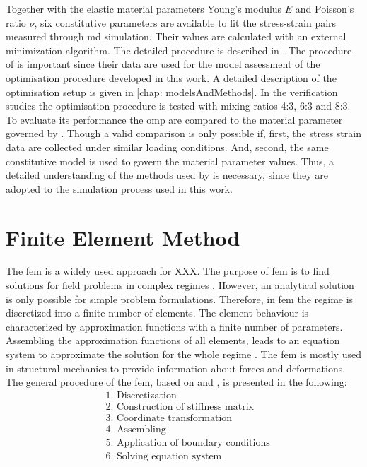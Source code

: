 Together with the elastic material parameters Young's modulus $E$ and Poisson's ratio $\nu$, six constitutive parameters are available to fit the stress-strain pairs measured through \acrshort{md} simulation. Their values are calculated with an external minimization algorithm. The detailed procedure is described in \cite{ries_deciphering_nodate}. The procedure of \citet{ries_deciphering_nodate} is important since their data are used for the model assessment of the optimisation procedure developed in this work. A detailed description of the optimisation setup is given in \autoref{chap: modelsAndMethods}. In the verification studies the optimisation procedure is tested with mixing ratios 4:3, 6:3 and 8:3. To evaluate its performance the \acrlong{omp} are compared to the material parameter governed by \citet{ries_deciphering_nodate}. Though a valid comparison is only possible if, first, the stress strain data are collected under similar loading conditions. And, second, the same constitutive model is used to govern the material parameter values. Thus, a detailed understanding of the methods used by \citet{ries_deciphering_nodate} is necessary, since they are adopted to the simulation process used in this work.  



\section{Finite Element Method} \label{sec: FEMBasics}

The \acrfull{fem} is a widely used approach for XXX. 
The purpose of \acrshort{fem} is to find solutions for field problems in complex regimes \cite{willner_vorlesungsskript_nodate}. However, an analytical solution is only possible for simple problem formulations. Therefore, in \acrshort{fem} the regime is discretized into a finite number of elements. The element behaviour is characterized by approximation functions with a finite number of parameters. Assembling the approximation functions of all elements, leads to an equation system to approximate the solution for the whole regime \cite{jagota_finite_nodate}. The \acrshort{fem} is mostly used in structural mechanics to provide information about forces and deformations. The general procedure of the \acrshort{fem}, based on \citet{willner_vorlesungsskript_nodate} and \citet{steinke_finite-elemente-methode_2015}, is presented in the following: 
\begin{align*}
    &\text{1. Discretization} \\
    &\text{2. Construction of stiffness matrix}\\ 
    &\text{3. Coordinate transformation} \\
    &\text{4. Assembling} \\
    &\text{5. Application of boundary conditions} \\
    &\text{6. Solving equation system}
\end{align*}

